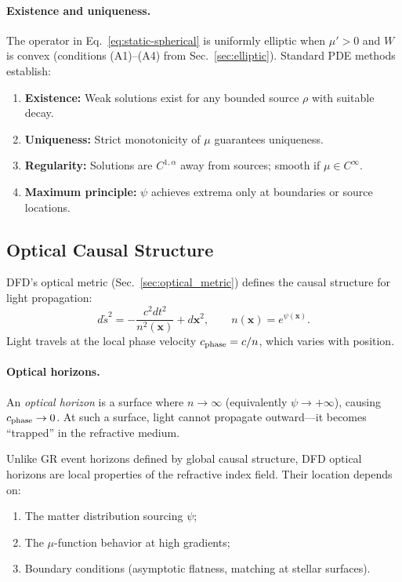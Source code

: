 \paragraph{Existence and uniqueness.}
The operator in Eq.~\eqref{eq:static-spherical} is uniformly elliptic when $\mu' > 0$ and $W$ is convex (conditions (A1)--(A4) from Sec.~\ref{sec:elliptic}). Standard PDE methods establish:
\begin{enumerate}
\item \textbf{Existence:} Weak solutions exist for any bounded source $\rho$ with suitable decay.
\item \textbf{Uniqueness:} Strict monotonicity of $\mu$ guarantees uniqueness.
\item \textbf{Regularity:} Solutions are $C^{1,\alpha}$ away from sources; smooth if $\mu \in C^\infty$.
\item \textbf{Maximum principle:} $\psi$ achieves extrema only at boundaries or source locations.
\end{enumerate}

\subsection{Optical Causal Structure}\label{sec:strong-causal}

DFD's optical metric (Sec.~\ref{sec:optical_metric}) defines the causal structure for light propagation:
\begin{equation}\label{eq:optical-metric-strong}
d\tilde{s}^2 = -\frac{c^2 dt^2}{n^2(\mathbf{x})} + d\mathbf{x}^2, \qquad n(\mathbf{x}) = e^{\psi(\mathbf{x})}.
\end{equation}
Light travels at the local phase velocity $c_{\rm phase} = c/n$, which varies with position.

\paragraph{Optical horizons.}
An \textit{optical horizon} is a surface where $n \to \infty$ (equivalently $\psi \to +\infty$), causing $c_{\rm phase} \to 0$. At such a surface, light cannot propagate outward---it becomes ``trapped'' in the refractive medium.

Unlike GR event horizons defined by global causal structure, DFD optical horizons are local properties of the refractive index field. Their location depends on:
\begin{enumerate}
\item The matter distribution sourcing $\psi$;
\item The $\mu$-function behavior at high gradients;
\item Boundary conditions (asymptotic flatness, matching at stellar surfaces).
\end{enumerate}


